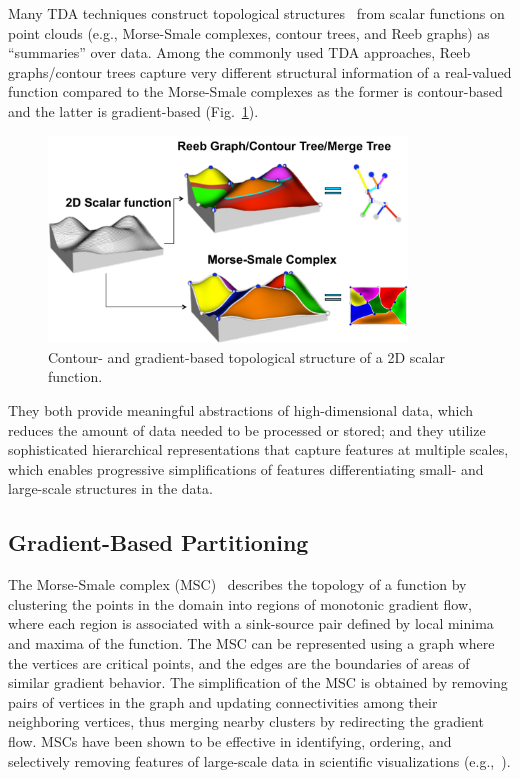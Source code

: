 Many TDA techniques construct topological structures~\cite{Reeb1946, Smale1961} from scalar functions on point clouds (e.g., Morse-Smale complexes, contour trees, and Reeb graphs) as ``summaries'' over data.
%
Among the commonly used TDA approaches, Reeb graphs/contour trees capture very different structural information of a real-valued function compared to the Morse-Smale complexes as the former is contour-based and the latter is gradient-based (Fig.~\ref{fig:topo-structure}).

\begin{figure}[!ht]
  \centering
  \includegraphics[width=0.85\textwidth]{figs/chap3/topostructure}
  \caption[Contour and Gradient-based Structures]{Contour- and gradient-based
  topological structure of a 2D scalar function.}
  \label{fig:topo-structure}
\end{figure}

They both provide meaningful abstractions of high-dimensional data, which reduces the amount of data needed to be processed or stored; and they utilize sophisticated hierarchical representations that capture features at multiple scales, which enables progressive simplifications of features differentiating small- and large-scale structures in the data.

\subsection{Gradient-Based Partitioning}
The Morse-Smale complex (MSC)~\cite{EdelsbrunnerHarerNatarajan2003, EdelsbrunnerHarerZomorodian2003} describes the topology of a function by clustering the points in the domain into regions of monotonic gradient flow, where each region is associated with a sink-source pair defined by local minima and maxima of the function.
%
The MSC can be represented using a graph where the vertices are critical points, and the edges are the boundaries of areas of similar gradient behavior.
%
The simplification of the MSC is obtained by removing pairs of vertices in the graph and updating connectivities among their neighboring vertices, thus merging nearby clusters by redirecting the gradient flow.
%
MSCs have been shown to be effective in identifying, ordering, and selectively removing features of large-scale data in scientific visualizations (e.g.,~\cite{BremerEdelsbrunnerHamann2004,GyulassyBremerPascucci2008, GyulassyNatarajanPascucci2005}).

